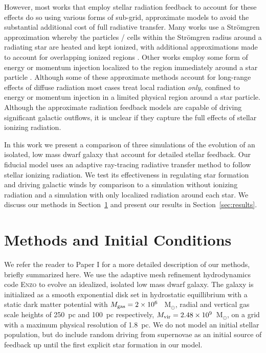 \documentclass[twocolumn]{aastex62}
\begin{document}
However, most works that employ stellar radiation feedback to account for these effects do so using various forms of sub-grid, approximate models to avoid the substantial additional cost of full radiative transfer. Many works use a Str{\"o}mgren approximation whereby the particles / cells within the Str{\"o}mgren radius around a radiating star are heated and kept ionized, with additional approximations made to account for overlapping ionized regions \citep[e.g.][]{HQM2011,Hu2016,Hu2017}. Other works employ some form of energy or momentum injection localized to the region immediately around a star particle \citep[e.g.][(\textit{need more})]{Agertz2013,Roskar2014,Ceverino2014,Forbes2016}. Although some of these approximate methods account for long-range effects of diffuse radiation \citep{HQM2012,Hopkins2018} most cases treat local radiation {\it only}, confined to energy or momentum injection in a limited physical region around a star particle. Although the approximate radiation feedback models are capable of driving significant galactic outflows, it is unclear if they capture the full effects of stellar ionizing radiation. 

In this work we present a comparison of three simulations of the evolution of an isolated, low mass dwarf galaxy that account for detailed stellar feedback. Our fiducial model uses an adaptive ray-tracing radiative transfer method to follow stellar ionizing radiation. We test its effectiveness in regulating star formation and driving galactic winds by comparison to a simulation without ionizing radiation and a simulation with only localized radiation around each star. We discuss our methods in Section~\ref{sec:methods} and present our results in Section~\ref{sec:results}.

\section{Methods and Initial Conditions} \label{sec:methods}
We refer the reader to Paper I for a more detailed description of our methods, briefly summarized here. We use the adaptive mesh refinement hydrodynamics code \textsc{Enzo} \citep{Enzo2014} to evolve an idealized, isolated low mass dwarf galaxy. The galaxy is initialized as a smooth exponential disk set in hydrostatic equillibrium with a static dark matter potential \citep{Burkert1995} with $M_{\rm gas} = 2 \times 10^6~$~M$_{\odot}$, radial and vertical gas scale heights of 250~pc and 100~pc respectively, $M_{\rm vir} = 2.48 \times 10^9$~M$_{\odot}$, on a grid with a maximum physical resolution of 1.8~pc. We do not model an initial stellar population, but do include random driving from supernovae as an initial source of feedback up until the first explicit star formation in our model.
\end{document}
